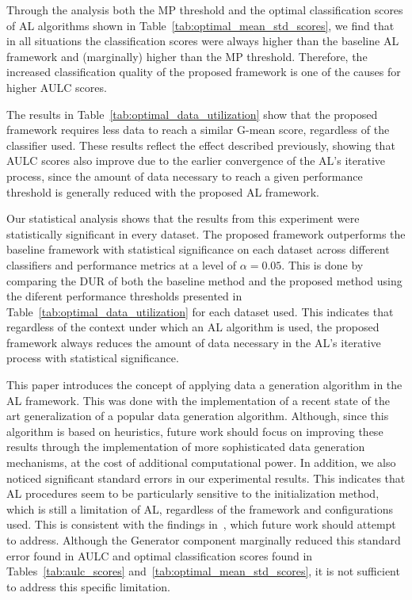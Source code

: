\documentclass[preprint,12pt]{elsarticle}
\begin{document}
Through the analysis both the MP threshold and the optimal classification
scores of AL algorithms shown in Table~\ref{tab:optimal_mean_std_scores}, we
find that in all situations the classification scores were always higher than
the baseline AL framework and (marginally) higher than the MP threshold.
Therefore, the increased classification quality of the proposed framework is
one of the causes for higher AULC scores.

The results in Table~\ref{tab:optimal_data_utilization} show that the proposed
framework requires less data to reach a similar G-mean score, regardless of
the classifier used. These results reflect the effect described previously,
showing that AULC scores also improve due to the earlier convergence of the
AL's iterative process, since the amount of data necessary to reach a given
performance threshold is generally reduced with the proposed AL framework.

Our statistical analysis shows that the results from this experiment were
statistically significant in every dataset. The proposed framework outperforms
the baseline framework with statistical significance on each dataset across
different classifiers and performance metrics at a level of $\alpha = 0.05$.
This is done by comparing the DUR of both the baseline method and the proposed
method using the diferent performance thresholds presented in
Table~\ref{tab:optimal_data_utilization} for each dataset used. This indicates
that regardless of the context under which an AL algorithm is used, the
proposed framework always reduces the amount of data necessary in the AL's
iterative process with statistical significance.

This paper introduces the concept of applying data a generation algorithm in
the AL framework. This was done with the implementation of a recent state of
the art generalization of a popular data generation algorithm. Although, since
this algorithm is based on heuristics, future work should focus on improving
these results through the implementation of more sophisticated data generation
mechanisms, at the cost of additional computational power. In addition, we
also noticed significant standard errors in our experimental results. This
indicates that AL procedures seem to be particularly sensitive to the
initialization method, which is still a limitation of AL, regardless of the
framework and configurations used. This is consistent with the findings
in~\cite{Kottke2017}, which future work should attempt to address. Although
the Generator component marginally reduced this standard error found in AULC
and optimal classification scores found in Tables~\ref{tab:aulc_scores}
and~\ref{tab:optimal_mean_std_scores}, it is not sufficient to address this
specific limitation.
\end{document}
